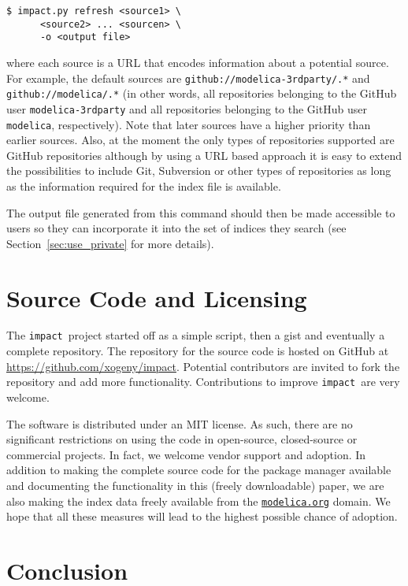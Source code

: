 \documentclass[11pt,a4paper,twocolumn]{article}
\newcommand{\impact}{\texttt{impact}} %
\newcommand{\code}[1]{\texttt{#1}} %
\begin{document}
\begin{verbatim}
$ impact.py refresh <source1> \
      <source2> ... <sourcen> \
      -o <output file>
\end{verbatim}

where each source is a URL that encodes information about a potential
source.  For example, the default sources are
\code{github://modelica-3rdparty/.*} and \code{github://modelica/.*}
(in other words, all repositories belonging to the GitHub user
\code{modelica-3rdparty} and all repositories belonging to the GitHub
user \code{modelica}, respectively).  Note that later sources have a
higher priority than earlier sources.  Also, at the moment the only
types of repositories supported are GitHub repositories although by
using a URL based approach it is easy to extend the possibilities to
include Git, Subversion or other types of repositories as long as the
information required for the index file is available.

The output file generated from this command should then be made
accessible to users so they can incorporate it into the set of indices
they search (see Section~\ref{sec:use_private} for more details).

\section{Source Code and Licensing}
\label{sec:source}

The \impact\ project started off as a simple script, then a gist and
eventually a complete repository.  The repository for the source code
is hosted on GitHub at \url{https://github.com/xogeny/impact}.
Potential contributors are invited to fork the repository and add more
functionality.  Contributions to improve \impact\ are very welcome.

The software is distributed under an MIT license.  As such, there are
no significant restrictions on using the code in open-source,
closed-source or commercial projects.  In fact, we welcome vendor
support and adoption.  In addition to making the complete source code
for the package manager available and documenting the functionality
in this (freely downloadable) paper, we are also making the index data
freely available from the \href{https://modelica.org}{\code{modelica.org}}
domain.  We hope that all these measures will lead to the highest possible
chance of adoption.

\section{Conclusion}
\label{sec:conclusion}
\end{document}
